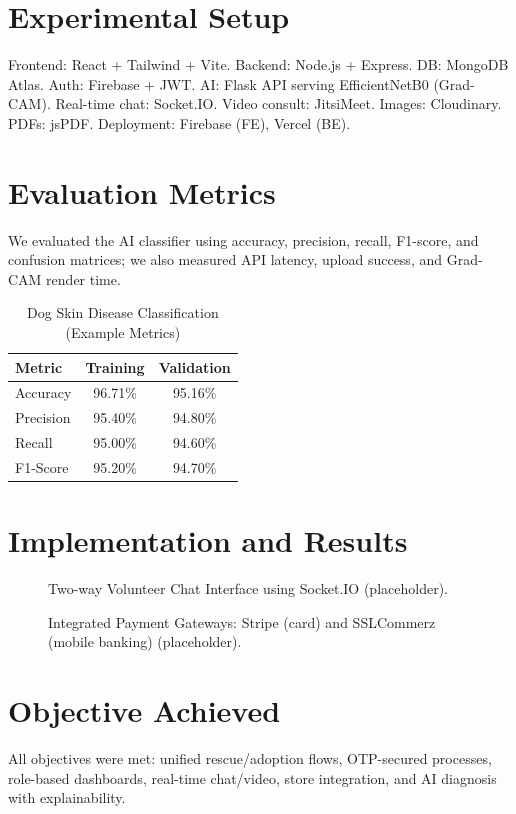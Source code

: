 \documentclass[12pt,a4paper]{report}
\numberwithin{figure}{chapter}
\numberwithin{table}{chapter}
\begin{document}
\section{Experimental Setup}
Frontend: React + Tailwind + Vite. Backend: Node.js + Express. DB: MongoDB Atlas. Auth: Firebase + JWT. AI: Flask API serving EfficientNetB0 (Grad-CAM). Real-time chat: Socket.IO. Video consult: JitsiMeet. Images: Cloudinary. PDFs: jsPDF. Deployment: Firebase (FE), Vercel (BE).

\section{Evaluation Metrics}
We evaluated the AI classifier using accuracy, precision, recall, F1-score, and confusion matrices; we also measured API latency, upload success, and Grad-CAM render time.

\begin{table}[H]
\centering
\caption{Dog Skin Disease Classification (Example Metrics)}
\begin{tabular}{lcc}
\toprule
Metric & Training & Validation \\
\midrule
Accuracy & 96.71\% & 95.16\% \\
Precision & 95.40\% & 94.80\% \\
Recall & 95.00\% & 94.60\% \\
F1-Score & 95.20\% & 94.70\% \\
\bottomrule
\end{tabular}
\end{table}

\section{Implementation and Results}
\begin{figure}[H]
  \centering
  \caption{Two-way Volunteer Chat Interface using Socket.IO (placeholder).}
\end{figure}

\begin{figure}[H]
  \centering
  \caption{Integrated Payment Gateways: Stripe (card) and SSLCommerz (mobile banking) (placeholder).}
\end{figure}

\section{Objective Achieved}
All objectives were met: unified rescue/adoption flows, OTP-secured processes, role-based dashboards, real-time chat/video, store integration, and AI diagnosis with explainability.
\end{document}
